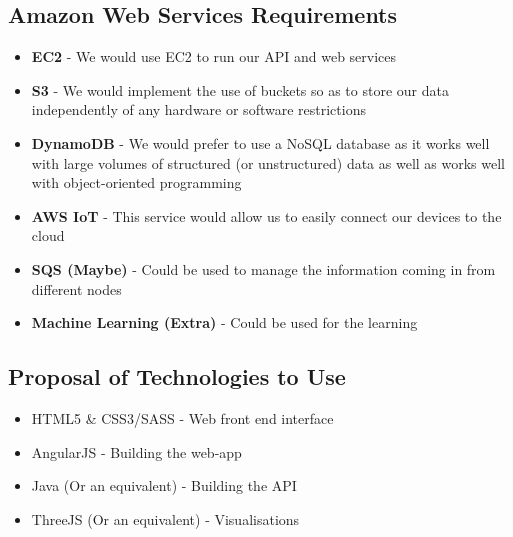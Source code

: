 \documentclass{article}
\begin{document}
	\subsection{Amazon Web Services Requirements}
		\begin{itemize}
			\item \textbf{EC2} - We would use EC2 to run our API and web services
			\item \textbf{S3} - We would implement the use of buckets so as to store our data independently of any hardware or software restrictions
			\item \textbf{DynamoDB} - We would prefer to use a NoSQL database as it works well with large volumes of structured (or unstructured) data as well as works well with object-oriented programming
			\item \textbf{AWS IoT} - This service would allow us to easily connect our devices to the cloud
			\item \textbf{SQS (Maybe)} - Could be used to manage the information coming in from different nodes
			\item \textbf{Machine Learning (Extra)} - Could be used for the learning
		\end{itemize}
	\subsection{Proposal of Technologies to Use}
		\begin{itemize}
			\item HTML5 \& CSS3/SASS - Web front end interface
			\item AngularJS - Building the web-app
			\item Java (Or an equivalent) - Building the API
			\item ThreeJS (Or an equivalent) - Visualisations
		\end{itemize}
\end{document}
